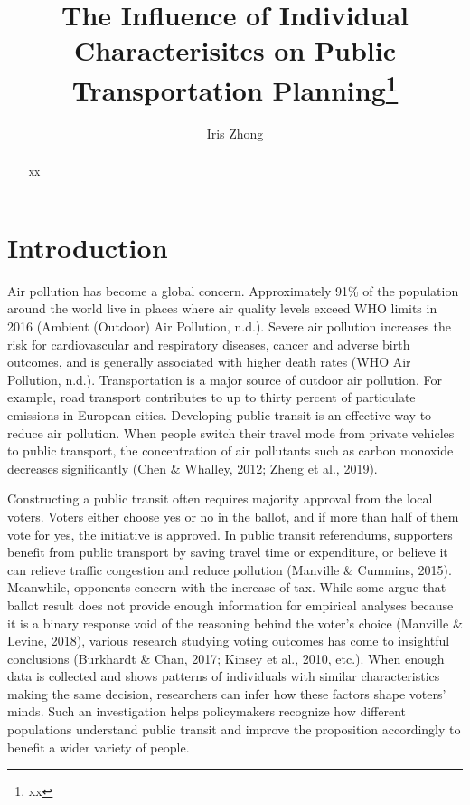 \documentclass[
]{article}
\title{The Influence of Individual Characterisitcs on Public
Transportation Planning\thanks{xx}}
\author{Iris Zhong}
\date{}
\begin{document}
\maketitle
\begin{abstract}
xx
\end{abstract}

\hypertarget{introduction}{%
\section{Introduction}\label{introduction}}

Air pollution has become a global concern. Approximately 91\% of the
population around the world live in places where air quality levels
exceed WHO limits in 2016 (Ambient (Outdoor) Air Pollution, n.d.).
Severe air pollution increases the risk for cardiovascular and
respiratory diseases, cancer and adverse birth outcomes, and is
generally associated with higher death rates (WHO \textbar{} Air
Pollution, n.d.). Transportation is a major source of outdoor air
pollution. For example, road transport contributes to up to thirty
percent of particulate emissions in European cities. Developing public
transit is an effective way to reduce air pollution. When people switch
their travel mode from private vehicles to public transport, the
concentration of air pollutants such as carbon monoxide decreases
significantly (Chen \& Whalley, 2012; Zheng et al., 2019).

Constructing a public transit often requires majority approval from the
local voters. Voters either choose yes or no in the ballot, and if more
than half of them vote for yes, the initiative is approved. In public
transit referendums, supporters benefit from public transport by saving
travel time or expenditure, or believe it can relieve traffic congestion
and reduce pollution (Manville \& Cummins, 2015). Meanwhile, opponents
concern with the increase of tax. While some argue that ballot result
does not provide enough information for empirical analyses because it is
a binary response void of the reasoning behind the voter's choice
(Manville \& Levine, 2018), various research studying voting outcomes
has come to insightful conclusions (Burkhardt \& Chan, 2017; Kinsey et
al., 2010, etc.). When enough data is collected and shows patterns of
individuals with similar characteristics making the same decision,
researchers can infer how these factors shape voters' minds. Such an
investigation helps policymakers recognize how different populations
understand public transit and improve the proposition accordingly to
benefit a wider variety of people.
\end{document}

